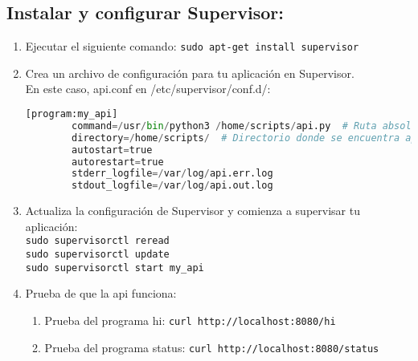 \documentclass{article}
\begin{document}
\subsection{Instalar y configurar Supervisor:}
\begin{enumerate}
    \item Ejecutar el siguiente comando: \texttt{sudo apt-get install supervisor}
    \item Crea un archivo de configuración para tu aplicación en Supervisor. \\ En este caso, api.conf en /etc/supervisor/conf.d/:
    \begin{lstlisting}[language=Python, caption=API básica con Bottle]
        [program:my_api]
        command=/usr/bin/python3 /home/scripts/api.py  # Ruta absoluta al script api.py
        directory=/home/scripts/  # Directorio donde se encuentra api.py
        autostart=true
        autorestart=true
        stderr_logfile=/var/log/api.err.log
        stdout_logfile=/var/log/api.out.log
        \end{lstlisting}
    \item Actualiza la configuración de Supervisor y comienza a supervisar tu aplicación:\\
        \texttt{sudo supervisorctl reread}\\ \texttt{sudo supervisorctl update}\\ \texttt{sudo supervisorctl start my\_api}
    \item Prueba de que la api funciona:
        \begin{enumerate}
            \item Prueba del programa hi: \texttt{curl http://localhost:8080/hi}
            \item Prueba del programa status: \texttt{curl http://localhost:8080/status}
        \end{enumerate}
\end{enumerate}


\end{document}

